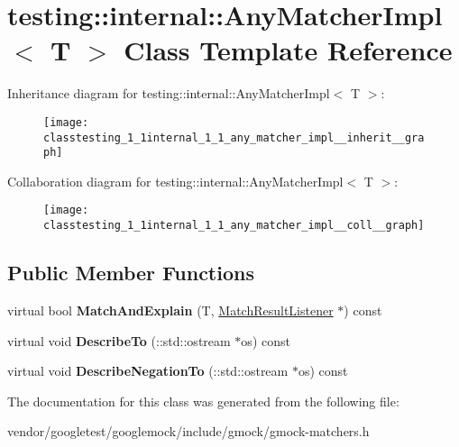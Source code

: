 \hypertarget{classtesting_1_1internal_1_1_any_matcher_impl}{}\section{testing\+:\+:internal\+:\+:Any\+Matcher\+Impl$<$ T $>$ Class Template Reference}
\label{classtesting_1_1internal_1_1_any_matcher_impl}


Inheritance diagram for testing\+:\+:internal\+:\+:Any\+Matcher\+Impl$<$ T $>$\+:
\nopagebreak
\begin{figure}[H]
\begin{center}
\leavevmode
\texttt{[image: classtesting\_1\_1internal\_1\_1\_any\_matcher\_impl\_\_inherit\_\_graph]}
\end{center}
\end{figure}


Collaboration diagram for testing\+:\+:internal\+:\+:Any\+Matcher\+Impl$<$ T $>$\+:
\nopagebreak
\begin{figure}[H]
\begin{center}
\leavevmode
\texttt{[image: classtesting\_1\_1internal\_1\_1\_any\_matcher\_impl\_\_coll\_\_graph]}
\end{center}
\end{figure}
\subsection*{Public Member Functions}
\begin{DoxyCompactItemize}
\item 
\mbox{\label{classtesting_1_1internal_1_1_any_matcher_impl_ac2d8f01b1c8ede16295f03eda91c5de1}} 
virtual bool {\bfseries Match\+And\+Explain} (T, \mbox{\hyperlink{classtesting_1_1_match_result_listener}{Match\+Result\+Listener}} $\ast$) const
\item 
\mbox{\label{classtesting_1_1internal_1_1_any_matcher_impl_a743f037083cc9992a4cc0d4e9842bc86}} 
virtual void {\bfseries Describe\+To} (\+::std\+::ostream $\ast$os) const
\item 
\mbox{\label{classtesting_1_1internal_1_1_any_matcher_impl_ac6570e881174ba774b8d56abaa4f7d25}} 
virtual void {\bfseries Describe\+Negation\+To} (\+::std\+::ostream $\ast$os) const
\end{DoxyCompactItemize}


The documentation for this class was generated from the following file\+:\begin{DoxyCompactItemize}
\item 
vendor/googletest/googlemock/include/gmock/gmock-\/matchers.\+h\end{DoxyCompactItemize}
